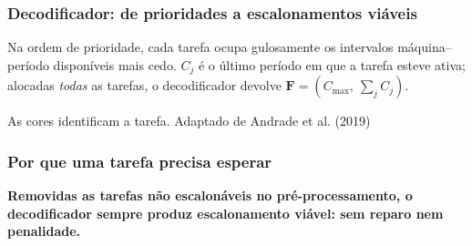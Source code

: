 \documentclass[
	11pt,
	aspectratio=169, %
]{beamer}
\newcommand{\takeaway}[1]{%
  \vspace{0.35em}%
  \begin{center}%
  \colorbox{mylightorange1!40}{%
    \parbox{0.90\textwidth}{\centering\small\textbf{#1}}}%
  \end{center}%
}
\begin{document}
\begin{frame}
\frametitle{Decodificador: de prioridades a escalonamentos vi\'aveis}

\begin{center}
\resizebox{0.97\textwidth}{!}{}
\end{center}

\vfill

{\small
Na ordem de prioridade, cada tarefa ocupa gulosamente os intervalos
m\'aquina--per\'iodo dispon\'iveis mais cedo. $C_{j}$ \'e o \'ultimo per\'iodo
em que a tarefa esteve ativa; alocadas \emph{todas} as tarefas, o decodificador
devolve $\mathbf{F} = (C_{\max},\ \sum_{j} C_{j})$.}

\vspace{0.2em}

{\raggedleft\scriptsize\color{black!55}As cores identificam a tarefa.
Adaptado de Andrade et al. (2019)\par}

\end{frame}

\begin{frame}
\frametitle{Por que uma tarefa precisa esperar}

\begin{center}
\resizebox{0.93\textwidth}{!}{}
\end{center}

\vfill

{\small
{}%
}

\vspace{0.2em}

\takeaway{Removidas as tarefas n\~ao escalon\'aveis no pr\'e-processamento, o
decodificador \textbf{sempre} produz escalonamento vi\'avel: sem reparo nem
penalidade.}

\end{frame}
\end{document}
